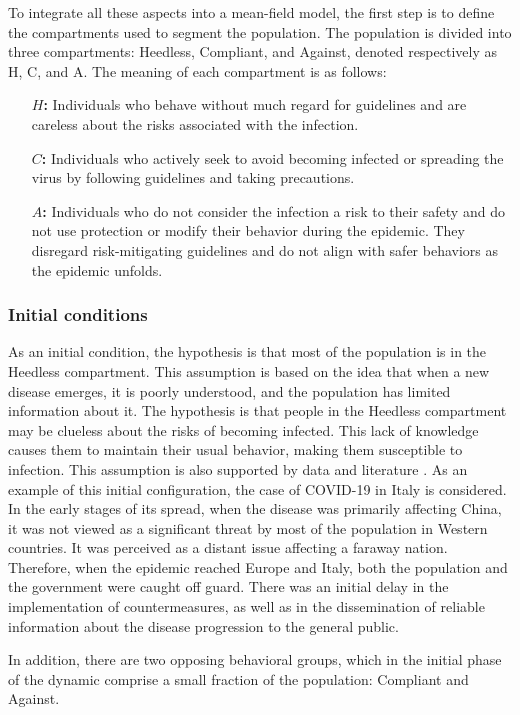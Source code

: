 To integrate all these aspects into a mean-field model, the first step is to define the compartments used to segment the population. The population is divided into three compartments: Heedless, Compliant, and Against, denoted respectively as H, C, and A. The meaning of each compartment is as follows:
\begin{itemize}
	\item[\textbf{$H$:}] Individuals who behave without much regard for guidelines and are careless about the risks associated with the infection.
	\item[\textbf{$C$:}] Individuals who actively seek to avoid becoming infected or spreading the virus by following guidelines and taking precautions.
	\item[\textbf{$A$:}]Individuals who do not consider the infection a risk to their safety and do not use protection or modify their behavior during the epidemic. They disregard risk-mitigating guidelines and do not align with safer behaviors as the epidemic unfolds.
\end{itemize}

\subsubsection{Initial conditions}
As an initial condition, the hypothesis is that most of the population is in the Heedless compartment. This assumption is based on the idea that when a new disease emerges, it is poorly understood, and the population has limited information about it. The hypothesis is that people in the Heedless compartment may be clueless about the risks of becoming infected. This lack of knowledge causes them to maintain their usual behavior, making them susceptible to infection. This assumption is also supported by data and literature \cite{Usher_2020}. As an example of this initial configuration, the case of COVID-19 in Italy is considered. In the early stages of its spread, when the disease was primarily affecting China, it was not viewed as a significant threat by most of the population in Western countries. It was perceived as a distant issue affecting a faraway nation. Therefore, when the epidemic reached Europe and Italy, both the population and the government were caught off guard. There was an initial delay in the implementation of countermeasures, as well as in the dissemination of reliable information about the disease progression to the general public.

In addition, there are two opposing behavioral groups, which in the initial phase of the dynamic comprise a small fraction of the population: Compliant and Against.

